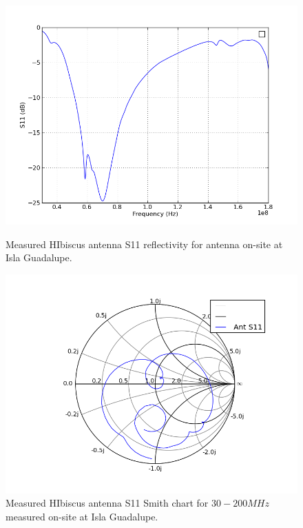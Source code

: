 \begin{figure}[htb]
\centering
\begin{minipage}[b]{0.51\textwidth}
\centering
\includegraphics[width=0.95\linewidth]{SCIHI_system/figures/HIbiscus_S11_dB_70MHz.png}
\caption{Measured HIbiscus antenna S11 reflectivity for antenna on-site at Isla Guadalupe. }
\label{Fig:HIS11_dB_70}
\end{minipage}%
\begin{minipage}[b]{0.02\textwidth}
\hspace{1cm}
\end{minipage}%
\begin{minipage}[b]{0.46\textwidth}
\centering
\includegraphics[width=0.95\linewidth]{SCIHI_system/figures/HIbiscus_S11_meas_smith.png}
\caption{Measured HIbiscus antenna S11 Smith chart for $30-200 MHz$ measured on-site at Isla Guadalupe.}
\label{Fig:HIS11_Smith_70}
\end{minipage}
\end{figure}

